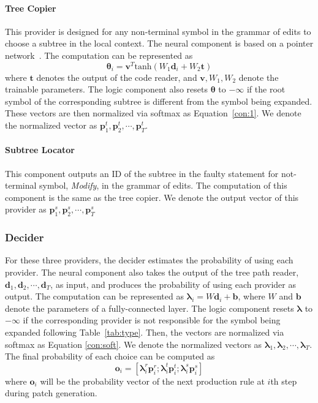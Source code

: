 \paragraph{\textbf{Tree Copier}}

This provider is designed for any non-terminal symbol in the grammar of edits to choose a subtree in the local context. The neural component is based on a pointer network~\cite{pointer}. The computation can be represented as 
\begin{equation}
    \bm{\theta}_i = \bm{v}^T\text{tanh}({W}_1\bm{d}_i + {W}_2\bm{t})
    \label{con:1}
\end{equation}
where $\bm{t}$ denotes the output of the code reader, and $\bm{v}, {W}_1, {W}_2$ denote the trainable parameters. The logic component also resets $\bm{\theta}$ to $-\infty$ if the root symbol of the corresponding subtree is different from the symbol being expanded. These vectors are then normalized via softmax as Equation~\ref{con:1}. We denote the normalized vector as $\bm p_1^t, \bm p_2^t,\cdots{}, \bm p_T^t$.
\paragraph{\textbf{Subtree Locator}}
This component outputs an ID of the subtree in the faulty statement for not-terminal symbol, \textit{Modify}, in the grammar of edits. The computation of this component is the same as the tree copier. We denote the output vector of this provider as $\bm p_1^s, \bm p_2^s,\cdots{}, \bm p_T^s$ 

\subsubsection{Decider}
For these three providers, the decider estimates the probability of using each provider. The neural component also takes the output of the tree path reader, $\bm{d}_1, \bm{d}_2,\cdots{}, \bm{d}_T$, as input, and produces the probability of using each provider as output. The computation can be represented as $\bm \lambda_i = {W}\bm{d}_i + \bm{b}$, where ${W}$ and $\bm{b}$ denote the parameters of a fully-connected layer. The logic component resets $\bm \lambda$ to $-\infty$ if the corresponding provider is not responsible for the symbol being expanded following Table~\ref{tab:type}. Then, the vectors are normalized via softmax as Equation \ref{con:soft}. We denote the normalized vectors as $\bm \lambda_1, \bm \lambda_2,\cdots{},\bm \lambda_T$. The final probability of each choice can be computed as 
\begin{equation}
    \bm o_i = [\bm \lambda_i^r \bm p_i^r;\bm \lambda_i^t \bm p_i^t;\bm \lambda_i^s \bm p_i^s]
\end{equation}
where $\bm o_i$ will be the probability vector of the next production rule at $i$th step during patch generation.

